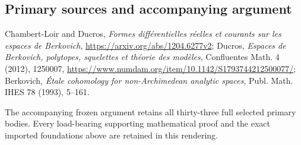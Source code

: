 \documentclass[
  10pt,
]{article}
\begin{document}
\subsection{Primary sources and accompanying argument}

Chambert-Loir and Ducros, \emph{Formes diff\'erentielles r\'eelles et
courants sur les espaces de Berkovich},
\url{https://arxiv.org/abs/1204.6277v2}; Ducros,
\emph{Espaces de Berkovich, polytopes, squelettes et th\'eorie des
mod\`eles}, Confluentes Math. 4 (2012), 1250007,
\url{https://www.numdam.org/item/10.1142/S1793744212500077/};
Berkovich, \emph{\'Etale cohomology for non-Archimedean analytic spaces},
Publ. Math. IHES 78 (1993), 5--161.

The accompanying frozen argument retains all thirty-three full selected
primary bodies. Every load-bearing supporting mathematical proof and
the exact imported foundations above are retained in this rendering.
\end{document}
